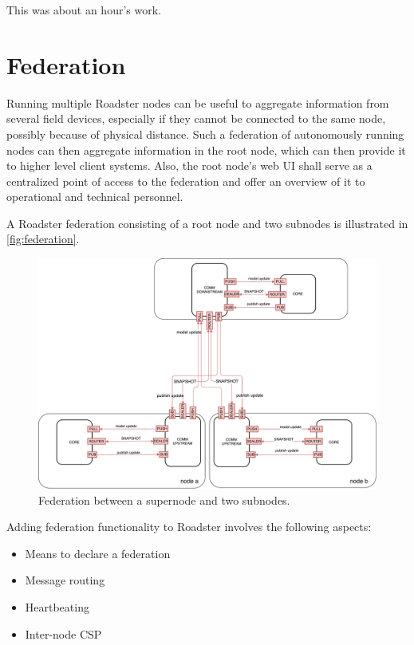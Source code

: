 This was about an hour's work.


\pagebreak
\section{Federation}\label{sec:approach:federation}
Running multiple Roadster nodes can be useful to aggregate information from
several field devices, especially if they cannot be connected to the same node,
possibly because of physical distance. Such a federation of autonomously
running nodes can then aggregate information in the root node, which can then
provide it to higher level client systems. Also, the root node's web UI shall
serve as a centralized point of access to the federation and offer an overview
of it to operational and technical personnel.

A Roadster federation consisting of a root node and two subnodes is illustrated
in \autoref{fig:federation}.
\begin{figure}[]
	\includegraphics[width=\textwidth]{img/federation_protocol.pdf}
	\caption{Federation between a supernode and two subnodes.}
	\label{fig:federation}
\end{figure}

Adding federation functionality to Roadster involves the following aspects:
\begin{itemize}
	\item Means to declare a federation
	\item Message routing
	\item Heartbeating
	\item Inter-node CSP
\end{itemize}

